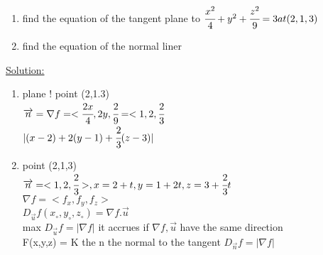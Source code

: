 \begin{example}
\begin{enumerate}
    \item find the equation of the tangent plane to $\cfrac{x^{2}}{4} + y^{2} + \cfrac{z^{2}}{9} = 3 at (2,1,3)$
    \item find the equation of the normal liner
\end{enumerate}

{\color{smalt(darkpowderblue)}\underline{Solution:}}
\begin{enumerate}
    \item plane ! point (2,1.3) \\
${\overrightarrow{n}} = \nabla f = <\cfrac{2x}{4},2y,\cfrac{2}{9} = <1,2,\cfrac{2}{3}$ \\
$|(x-2) + 2(y-1) + \cfrac{2}{3} (z-3)|$
\item point (2,1,3)\\
${\overrightarrow{n}} = <1,2,\cfrac{2}{3}> , x=2+t \\
                                          , y=1+2t\\
                                          , z=3+\cfrac{2}{3}t $\\
$\nabla f = <f_x,f_y,f_z>$\\
$D_{\overrightarrow{u}} f(x_\circ , y_\circ , z_\circ) = \nabla f .{\overrightarrow{u}}$\\
max $D_{\overrightarrow{u}} f = |\nabla f|$ it accrues if $\nabla f ,{\overrightarrow{u}}$ have the same direction \\
F(x,y,z) = K the n the normal to the tangent $D_{\overrightarrow{n}} f = |\nabla f|$ 
\end{enumerate}
\end{example}